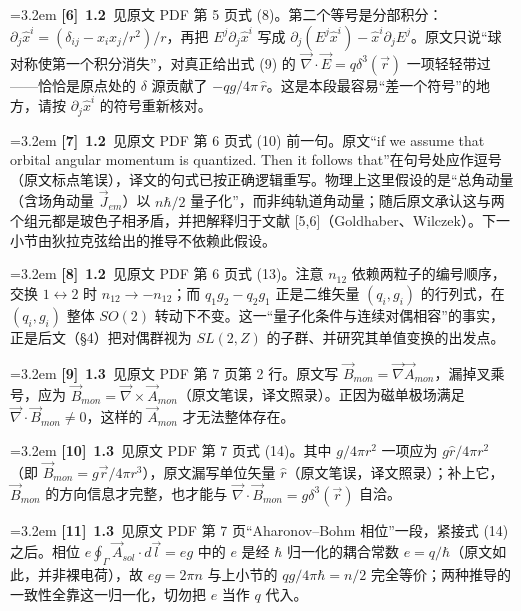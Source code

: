 \par
\par\medskip\noindent\hangindent=3.2em \textbf{[6]}~\textbf{1.2}~见原文 PDF 第 5 页式 (8)。第二个等号是分部积分：$\partial_j\hat{x}^i=(\delta_{ij}-x_ix_j/r^2)/r$，再把 $E^j\partial_j\hat{x}^i$ 写成 $\partial_j(E^j\hat{x}^i)-\hat{x}^i\partial_j E^j$。原文只说“球对称使第一个积分消失”，对真正给出式 (9) 的 $\vec{\nabla}\cdot\vec{E}=q\delta^{3}(\vec{r})$ 一项轻轻带过——恰恰是原点处的 $\delta$ 源贡献了 $-qg/4\pi\,\hat{r}$。这是本段最容易“差一个符号”的地方，请按 $\partial_j\hat{x}^i$ 的符号重新核对。
\par
\par\medskip\noindent\hangindent=3.2em \textbf{[7]}~\textbf{1.2}~见原文 PDF 第 6 页式 (10) 前一句。原文“if we assume that orbital angular momentum is quantized. Then it follows that”在句号处应作逗号（原文标点笔误），译文的句式已按正确逻辑重写。物理上这里假设的是“总角动量（含场角动量 $\vec{J}_{em}$）以 $n\hbar/2$ 量子化”，而非纯轨道角动量；随后原文承认这与两个组元都是玻色子相矛盾，并把解释归于文献 [5,6]（Goldhaber、Wilczek）。下一小节由狄拉克弦给出的推导不依赖此假设。
\par
\par\medskip\noindent\hangindent=3.2em \textbf{[8]}~\textbf{1.2}~见原文 PDF 第 6 页式 (13)。注意 $n_{12}$ 依赖两粒子的编号顺序，交换 $1\leftrightarrow2$ 时 $n_{12}\to-n_{12}$；而 $q_1g_2-q_2g_1$ 正是二维矢量 $(q_i,g_i)$ 的行列式，在 $(q_i,g_i)$ 整体 $SO(2)$ 转动下不变。这一“量子化条件与连续对偶相容”的事实，正是后文（§4）把对偶群视为 $SL(2,Z)$ 的子群、并研究其单值变换的出发点。
\par
\par\medskip\noindent\hangindent=3.2em \textbf{[9]}~\textbf{1.3}~见原文 PDF 第 7 页第 2 行。原文写 $\vec{B}_{mon}=\vec{\nabla} \vec{A}_{mon}$，漏掉叉乘号，应为 $\vec{B}_{mon}=\vec{\nabla}\times\vec{A}_{mon}$（原文笔误，译文照录）。正因为磁单极场满足 $\vec{\nabla}\cdot\vec{B}_{mon}\ne 0$，这样的 $\vec{A}_{mon}$ 才无法整体存在。
\par
\par\medskip\noindent\hangindent=3.2em \textbf{[10]}~\textbf{1.3}~见原文 PDF 第 7 页式 (14)。其中 $g/4\pi r^{2}$ 一项应为 $g\hat{r}/4\pi r^{2}$（即 $\vec{B}_{mon}=g\vec{r}/4\pi r^{3}$），原文漏写单位矢量 $\hat{r}$（原文笔误，译文照录）；补上它，$\vec{B}_{mon}$ 的方向信息才完整，也才能与 $\vec{\nabla}\cdot\vec{B}_{mon}=g\delta^{3}(\vec{r})$ 自洽。
\par
\par\medskip\noindent\hangindent=3.2em \textbf{[11]}~\textbf{1.3}~见原文 PDF 第 7 页“Aharonov–Bohm 相位”一段，紧接式 (14) 之后。相位 $e\oint_\Gamma\vec{A}_{sol}\cdot d\vec{l}=eg$ 中的 $e$ 是经 $\hbar$ 归一化的耦合常数 $e=q/\hbar$（原文如此，并非裸电荷），故 $eg=2\pi n$ 与上小节的 $qg/4\pi\hbar=n/2$ 完全等价；两种推导的一致性全靠这一归一化，切勿把 $e$ 当作 $q$ 代入。
